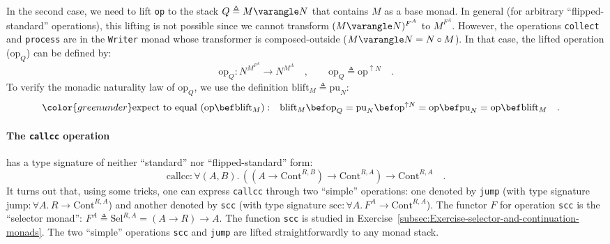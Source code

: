 In the second case, we need to lift \lstinline!op! to the stack $Q\triangleq M\varangle N$
that contains $M$ as a base monad. In general (for arbitrary \textsf{``}flipped-standard\textsf{''}
operations), this lifting is not possible since we cannot transform
$(M\varangle N)^{F^{A}}$ to $M^{F^{A}}$. However, the operations
\lstinline!collect! and \lstinline!process! are in the \lstinline!Writer!
monad whose transformer is composed-outside ($M\varangle N=N\circ M$).
In that case, the lifted operation ($\text{op}_{Q}$) can be defined
by:
\[
\text{op}_{Q}:N^{M^{F^{A}}}\rightarrow N^{M^{A}}\quad,\quad\quad\text{op}_{Q}\triangleq\text{op}^{\uparrow N}\quad.
\]
To verify the monadic naturality law of $\text{op}_{Q}$, we use the
definition $\text{blift}_{M}\triangleq\text{pu}_{N}$:
\begin{align*}
{\color{greenunder}\text{expect to equal }(\text{op}\bef\text{blift}_{M}):}\quad & \text{blift}_{M}\bef\text{op}_{Q}=\text{pu}_{N}\bef\text{op}^{\uparrow N}=\text{op}\bef\text{pu}_{N}=\text{op}\bef\text{blift}_{M}\quad.
\end{align*}


\paragraph{The \texttt{callcc} operation}

has a type signature of neither \textsf{``}standard\textsf{''} nor \textsf{``}flipped-standard\textsf{''}
form:
\[
\text{callcc}:\forall(A,B).\,((A\rightarrow\text{Cont}^{R,B})\rightarrow\text{Cont}^{R,A})\rightarrow\text{Cont}^{R,A}\quad.
\]
It turns out that, using some tricks, one can express \lstinline!callcc!
through two \textsf{``}simple\textsf{''} operations: one denoted by \lstinline!jump!
(with type signature $\text{jump}:\forall A.\,R\rightarrow\text{Cont}^{R,A}$)
and another denoted by \lstinline!scc! (with type signature $\text{scc}:\forall A.\,F^{A}\rightarrow\text{Cont}^{R,A}$).
The functor $F$ for operation \lstinline!scc! is the \textsf{``}selector
monad\textsf{''}: $F^{A}\triangleq\text{Sel}^{R,A}=(A\rightarrow R)\rightarrow A$.
The function \lstinline!scc! is studied in Exercise~\ref{subsec:Exercise-selector-and-continuation-monads}.
The two \textsf{``}simple\textsf{''} operations \lstinline!scc! and \lstinline!jump!
are lifted straightforwardly to any monad stack. 

